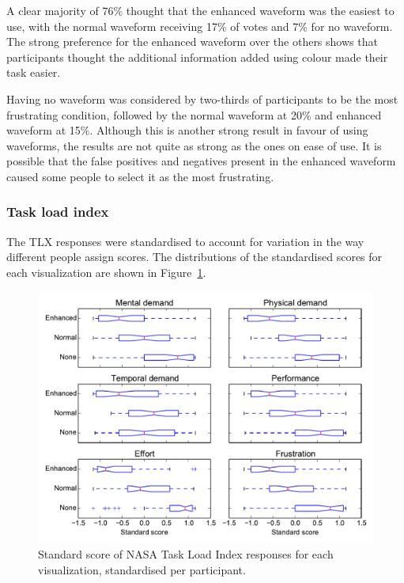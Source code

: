 A clear majority of 76\% thought that the enhanced waveform was the easiest to
use, with the normal waveform receiving 17\% of votes and 7\% for no waveform.
The strong preference for the enhanced waveform over the others shows that
participants thought the additional information added using colour made their
task easier.

Having no waveform was considered by two-thirds of participants to be the most
frustrating condition, followed by the normal waveform at 20\% and enhanced
waveform at 15\%. Although this is another strong result in favour of using
waveforms, the results are not quite as strong as the ones on ease of
use. It is possible that the false positives and negatives present in the
enhanced waveform caused some people to select it as the most frustrating.

\subsubsection{Task load index}
The TLX responses were standardised to account for variation in the way
different people assign scores. The distributions of the standardised scores
for each visualization are shown in Figure~\ref{fig:tlx}.

\begin{figure}[p]
  \centering
  \includegraphics[width=\textwidth]{figs/tlx-std.pdf}
  \caption{Standard score of NASA Task Load Index responses for each
    visualization, standardised per participant.}
  \label{fig:tlx}
\end{figure}

